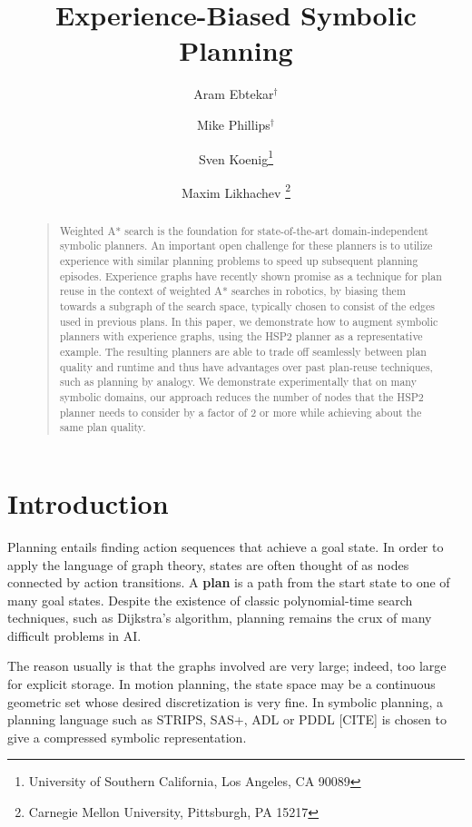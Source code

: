 \documentclass[letterpaper]{article}
\begin{document}
%
\title{Experience-Biased Symbolic Planning}
\author{Aram Ebtekar$^\dagger$ \and Mike Phillips$^\dagger$ \and Sven Koenig\thanks{University of Southern California, Los Angeles, CA 90089} \and Maxim Likhachev%
\thanks{Carnegie Mellon University, Pittsburgh, PA 15217}%
%
}
\maketitle
\begin{abstract}
\begin{quote}
Weighted A* search is the foundation for state-of-the-art domain-independent symbolic planners.
An important open challenge for these planners is to utilize experience with similar planning problems to speed up subsequent planning episodes.
Experience graphs have recently shown promise as a technique for plan reuse in the context of weighted A* searches in robotics, by biasing them towards a subgraph of the search space, typically chosen to consist of the edges used in previous plans.
In this paper, we demonstrate how to augment symbolic planners with
experience graphs, using the HSP2 planner as a representative
example.
The resulting planners are able to trade off seamlessly
between plan quality and runtime and thus have advantages over past
plan-reuse techniques, such as planning by analogy.
We demonstrate experimentally that on many symbolic domains, our approach reduces the number of nodes that the HSP2 planner needs to consider by a factor of 2 or more while achieving about the same plan quality.
\end{quote}
\end{abstract}

\section{Introduction}
Planning entails finding action sequences that achieve a goal state.
In order to apply the language of graph theory, states are often thought of as nodes connected by action transitions.
A \textbf{plan} is a path from the start state to one of many goal states.
Despite the existence of classic polynomial-time search techniques, such as Dijkstra's algorithm, planning remains the crux of many difficult problems in AI.

The reason usually is that the graphs involved are very large; indeed, too large for explicit storage.
In motion planning, the state space may be a continuous geometric set whose desired discretization is very fine.
In symbolic planning, a planning language such as STRIPS, SAS+, ADL or PDDL [CITE] is chosen to give a compressed symbolic representation.
\end{document}
